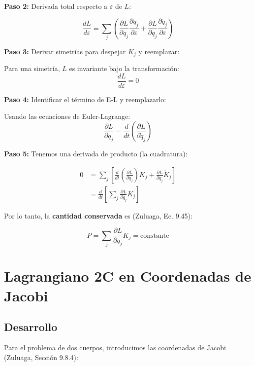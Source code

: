 \documentclass[a4paper]{article}
\begin{document}
\textbf{Paso 2:} Derivada total respecto a $\varepsilon$ de $L$:

\begin{equation}
\frac{dL}{d\varepsilon} = \sum_j \left(\frac{\partial L}{\partial q_j}\frac{\partial q_j}{\partial \varepsilon} + \frac{\partial L}{\partial \dot{q}_j}\frac{\partial \dot{q}_j}{\partial \varepsilon}\right)
\end{equation}

\textbf{Paso 3:} Derivar simetrías para despejar $K_j$ y reemplazar:

Para una simetría, $L$ es invariante bajo la transformación:
\begin{equation}
\frac{dL}{d\varepsilon} = 0
\end{equation}

\textbf{Paso 4:} Identificar el término de E-L y reemplazarlo:

Usando las ecuaciones de Euler-Lagrange:
\begin{equation}
\frac{\partial L}{\partial q_j} = \frac{d}{dt}\left(\frac{\partial L}{\partial \dot{q}_j}\right)
\end{equation}

\textbf{Paso 5:} Tenemos una derivada de producto (la cuadratura):

\begin{align}
0 &= \sum_j \left[\frac{d}{dt}\left(\frac{\partial L}{\partial \dot{q}_j}\right)K_j + \frac{\partial L}{\partial \dot{q}_j}\dot{K}_j\right] \\
&= \frac{d}{dt}\left[\sum_j \frac{\partial L}{\partial \dot{q}_j}K_j\right]
\end{align}

Por lo tanto, la \textbf{cantidad conservada} es (Zuluaga, Ec. 9.45):

\begin{equation}
P = \sum_j \frac{\partial L}{\partial \dot{q}_j}K_j = \text{constante}
\end{equation}

\section{Lagrangiano 2C en Coordenadas de Jacobi}

\subsection*{Desarrollo}

Para el problema de dos cuerpos, introducimos las coordenadas de Jacobi (Zuluaga, Sección 9.8.4):
\end{document}
